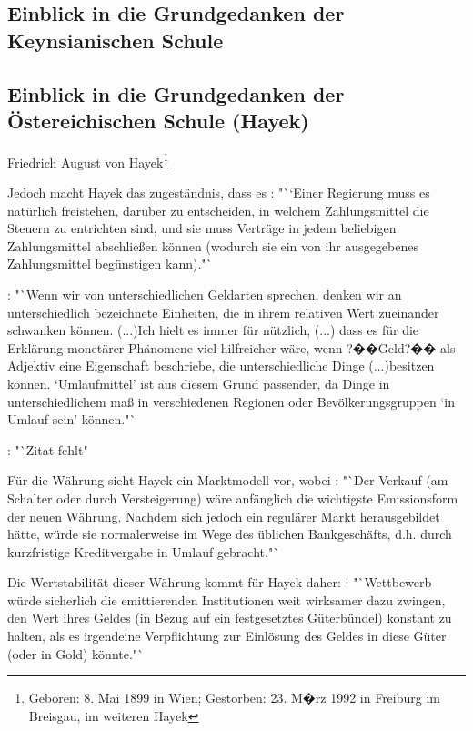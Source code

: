 \documentclass[
onecolumn,
a4paper,
abstracton,
parskip=half
,final
]{scrartcl}
\begin{document}
\subsection{Einblick in die Grundgedanken der Keynsianischen Schule}

\subsection{Einblick in die Grundgedanken der {\"O}stereichischen Schule (Hayek)}


Friedrich August von Hayek\footnote[15]{ Geboren: 8. Mai 1899 in Wien; Gestorben: 23. M�rz 1992 in Freiburg im Breisgau, im weiteren Hayek}

Jedoch macht Hayek das zugest{\"a}ndnis, dass es \citep[vgl.][S.23]{Hayek1977}: "``Einer Regierung muss es nat{\"u}rlich freistehen, dar{\"u}ber zu entscheiden, in welchem Zahlungsmittel die Steuern zu entrichten sind, und sie muss Vertr{\"a}ge in jedem beliebigen Zahlungsmittel abschlie{\ss}en k{\"o}nnen (wodurch sie ein von ihr ausgegebenes Zahlungsmittel beg{\"u}nstigen kann)."`



\citep[vgl.][S.40f]{Hayek1977}: "`Wenn wir von unterschiedlichen Geldarten sprechen, denken wir an unterschiedlich bezeichnete Einheiten, die in ihrem relativen Wert zueinander schwanken k{\"o}nnen. (...)Ich hielt es immer f{\"u}r n{\"u}tzlich, (...) dass es f{\"u}r die Erkl{\"a}rung monet{\"a}rer Ph{\"a}nomene viel hilfreicher w{\"a}re, wenn ?��Geld?�� als Adjektiv eine Eigenschaft beschriebe, die unterschiedliche Dinge (...)besitzen k{\"o}nnen. `Umlaufmittel' ist aus diesem Grund passender, da Dinge in unterschiedlichem ma{\ss} in verschiedenen Regionen oder Bev{\"o}lkerungsgruppen `in Umlauf sein' k{\"o}nnen."`

\citep[vgl.][S.43]{Hayek1977}: "`Zitat fehlt"

F{\"u}r die W{\"a}hrung sieht Hayek ein Marktmodell vor, wobei \citep[vgl.][S.31]{Hayek1977}: "`Der Verkauf (am Schalter oder durch Versteigerung) w{\"a}re anf{\"a}nglich die wichtigste Emissionsform der neuen W{\"a}hrung. Nachdem sich jedoch ein regul{\"a}rer Markt herausgebildet h{\"a}tte, w{\"u}rde sie normalerweise im Wege des {\"u}blichen Bankgesch{\"a}fts, d.h. durch kurzfristige Kreditvergabe in Umlauf gebracht."`

Die Wertstabilit{\"a}t dieser W{\"a}hrung kommt f{\"u}r Hayek daher: \citep[vgl.][S.32]{Hayek1977}: "`Wettbewerb w{\"u}rde sicherlich die emittierenden Institutionen weit wirksamer dazu zwingen, den Wert ihres Geldes (in Bezug auf ein festgesetztes G{\"u}terb{\"u}ndel) konstant zu halten, als es irgendeine Verpflichtung zur Einl{\"o}sung des Geldes in diese G{\"u}ter (oder in Gold) k{\"o}nnte."`
\end{document}
